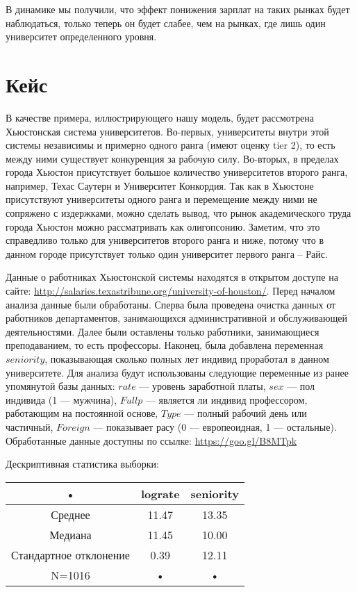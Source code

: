 \documentclass[a4paper, 12pt]{article}
\theoremstyle{definition}
\theoremstyle{plain}
\begin{document}
В динамике мы получили, что эффект понижения зарплат на таких рынках будет наблюдаться, только теперь он будет  слабее, чем на рынках, где лишь один университет определенного уровня.

\section{Кейс}

В качестве примера, иллюстрирующего нашу модель, будет рассмотрена Хьюстонская система университетов. Во-первых, университеты внутри этой системы независимы и примерно одного ранга (имеют оценку tier 2), то есть между ними существует конкуренция за рабочую силу. Во-вторых, в пределах города Хьюстон присутствует большое количество университетов второго ранга, например, Техас Саутерн и Университет Конкордия. Так как в Хьюстоне присутствуют университеты одного ранга и перемещение между ними не сопряжено с издержками, можно сделать вывод, что рынок академического труда города Хьюстон можно рассматривать как олигопсонию. Заметим, что это справедливо только для университетов второго ранга и ниже, потому что в данном городе присутствует только один университет первого ранга -- Райс.

Данные о работниках Хьюстонской системы находятся в открытом доступе на сайте: \url{http://salaries.texastribune.org/university-of-houston/}. Перед началом анализа данные были обработаны. Сперва была проведена очистка данных от работников департаментов, занимающихся административной и обслуживающей деятельностями. Далее были оставлены только работники, занимающиеся преподаванием, то есть профессоры. Наконец, была добавлена переменная $seniority$, показывающая сколько полных лет индивид проработал в данном университете.
Для анализа будут использованы следующие переменные из ранее упомянутой базы данных: $rate$ --- уровень заработной платы, $sex$ --- пол индивида (1 --- мужчина), $Fullp$ --- является ли индивид профессором, работающим на постоянной основе, $Type$ --- полный рабочий день или частичный, $Foreign$ --- показывает расу (0 --- европеоидная, 1 --- остальные). Обработанные данные доступны по ссылке: \url{https://goo.gl/B8MTpk}


Дескриптивная статистика выборки:

\begin{center}
\begin{tabular}{|c|c|c|}
\hline 
• & lograte & seniority \\ 
\hline 
Среднее & 11.47 & 13.35 \\ 
\hline 
Медиана & 11.45 & 10.00 \\ 
\hline 
Стандартное отклонение & 0.39 & 12.11 \\ 
\hline 
N=1016 & • & • \\ 
\hline 
\end{tabular} 
\end{center}
\end{document}

